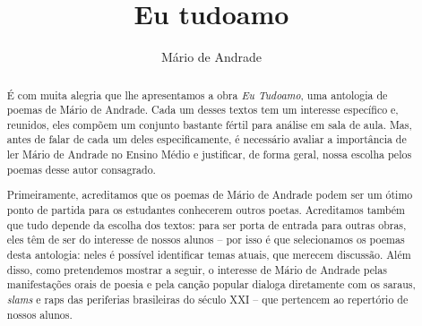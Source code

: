 \documentclass[11pt]{extarticle}
\begin{document}
\newcommand{\AutorLivro}{Mário de Andrade}
\newcommand{\TituloLivro}{Eu tudoamo}
\newcommand{\Tema}{Ficção, mistério e fantasia}
\newcommand{\Genero}{Poema}
\newcommand{\imagemCapa}{./images/PNLD0005-01.png}
\newcommand{\issnppub}{---}
\newcommand{\issnepub}{---}
\newcommand{\colaborador}{Carlos Rogério Duarte Barreiros}


\title{\TituloLivro}
\author{\AutorLivro}
\def\authornotes{\colaborador}

\date{}
\maketitle


\begin{abstract}

É com muita alegria que lhe apresentamos a obra \emph{Eu Tudoamo}, uma
antologia de poemas de Mário de Andrade. Cada um desses textos tem um
interesse específico e, reunidos, eles compõem um conjunto bastante
fértil para análise em sala de aula. Mas, antes de falar de cada um
deles especificamente, é necessário avaliar a importância de ler Mário
de Andrade no Ensino Médio e justificar, de forma geral, nossa escolha
pelos poemas desse autor consagrado.

Primeiramente, acreditamos que os poemas de Mário de Andrade podem ser
um ótimo ponto de partida para os estudantes conhecerem outros poetas.
Acreditamos também que tudo depende da escolha dos textos: para ser
porta de entrada para outras obras, eles têm de ser do interesse de
nossos alunos -- por isso é que selecionamos os poemas desta antologia:
neles é possível identificar temas atuais, que merecem discussão. Além
disso, como pretendemos mostrar a seguir, o interesse de Mário de
Andrade pelas manifestações orais de poesia e pela canção popular
dialoga diretamente com os saraus, \emph{slams} e raps das periferias
brasileiras do século XXI -- que pertencem ao repertório de nossos
alunos.


\end{abstract}
\end{document}

